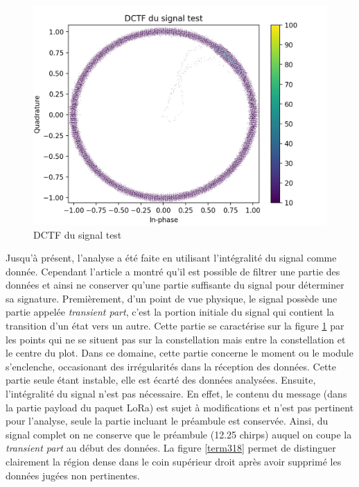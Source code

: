 \begin{figure}[h]
\centering

\includegraphics[scale=0.3]{images/dctf4.png}
\caption{DCTF du signal test}\label{term317}
\end{figure}

Jusqu'à présent, l'analyse a été faite en utilisant l'intégralité du signal comme donnée. Cependant l'article \cite{loraDCTF} a montré qu'il est possible de filtrer une partie des données et ainsi ne conserver qu'une partie suffisante du signal pour déterminer sa signature. Premièrement, d'un point de vue physique, le signal possède une partie appelée \textit{transient part}, c'est la portion initiale du signal qui contient la transition d'un état vers un autre. Cette partie se caractérise sur la figure \ref{term317} par les points qui ne se situent pas sur la constellation mais entre la constellation et le centre du plot. Dans ce domaine, cette partie concerne le moment ou le module s'enclenche, occasionant des irrégularités dans la réception des données. Cette partie seule étant instable, elle est écarté des données analysées. Ensuite, l'intégralité du signal n'est pas nécessaire. En effet, le contenu du message (dans la partie payload du paquet LoRa) est sujet à modifications et n'est pas pertinent pour l'analyse, seule la partie incluant le préambule est conservée. Ainsi, du signal complet on ne conserve que le préambule (12.25 chirps) auquel on coupe la \textit{transient part} au début des données. La figure \ref{term318} permet de distinguer clairement la région dense dans le coin supérieur droit après avoir supprimé les données jugées non pertinentes.

